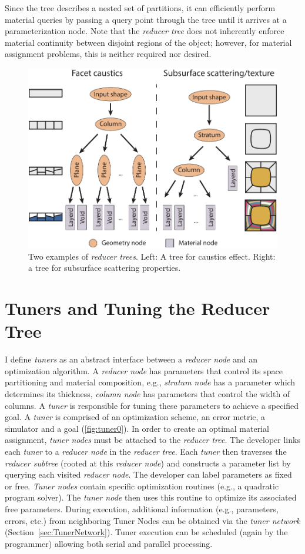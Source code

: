 Since the tree describes a nested set of partitions, it can efficiently perform material queries by passing a query point through the tree until it arrives at a parameterization node. 
Note that the \emph{reducer tree} does not inherently enforce material continuity between disjoint regions of the object; however, for material assignment problems, this is neither required nor desired. 

\begin{figure}[h]
\centering
\includegraphics[width=0.7\linewidth]{figure/redNetworkNew.pdf}
\caption{Two examples of \emph{reducer trees}. Left: A tree for caustics effect.
Right: a tree for subsurface scattering properties.
}
\label{fig:red1}
\end{figure}

\section{Tuners and Tuning the Reducer Tree}
I define \emph{tuners} as an abstract interface between a \emph{reducer node} and an optimization algorithm. 
A \emph{reducer node} has parameters that control its space partitioning and material composition,
e.g., \emph{stratum node} has a parameter which determines its thickness,
\emph{column node} has parameters that control the width of columns.
A \emph{tuner} is responsible for tuning these parameters to achieve a specified goal.
A \emph{tuner} is comprised of an optimization scheme, an error metric, a simulator and a goal (\autoref{fig:tuner0}). 
In order to create an optimal material assignment, \emph{tuner nodes} must be attached to the \emph{reducer tree}.
The developer links each \emph{tuner} to a \emph{reducer node} in the \emph{reducer tree}.
Each \emph{tuner} then traverses the \emph{reducer subtree} (rooted at this \emph{reducer node})
and constructs a parameter list by querying each visited \emph{reducer node}.
The developer can label parameters as fixed or free. \emph{Tuner nodes} contain specific optimization routines
(e.g., a quadratic program solver).
The \emph{tuner node} then uses this routine to optimize its associated free parameters.
During execution, additional information (e.g., parameters, errors, etc.) from neighboring Tuner Nodes
can be obtained via the \emph{tuner network} (Section~\ref{sec:TunerNetwork}).
Tuner execution can be scheduled (again by the programmer) allowing both serial and parallel processing.

